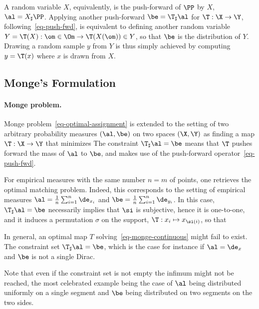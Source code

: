 \begin{rem}
A random variable $X$, equivalently, is the push-forward of $\PP$ by $X$, $\al=X_\sharp\PP$.
%
Applying another push-forward $\be = \T_\sharp\al$ for $\T : \X \rightarrow \Y$, following~\eqref{eq-push-fwd}, is equivalent to defining another random variable $Y=\T(X) : \om \in \Om \rightarrow \T(X(\om)) \in Y$, so that $\be$ is the distribution of $Y$.
%
Drawing a random sample $y$ from $Y$ is thus simply achieved by computing $y=\T(x)$ where $x$ is drawn from $X$. 
\end{rem}


\subsection{Monge's Formulation}


\paragraph{Monge problem.}

Monge problem~\eqref{eq-optimal-assignment} is extended to the setting of two arbitrary probability measures $(\al,\be)$ on two spaces $(\X,\Y)$ as finding a map $\T : \X \rightarrow \Y$ that minimizes
The constraint $\T_\sharp \al = \be$ means that $\T$ pushes forward the mass of $\al$ to $\be$, and makes use of the push-forward operator~\eqref{eq-push-fwd}. 

For empirical measures with the same number $n=m$ of points, one retrieves the optimal matching problem. Indeed, this corresponds to the setting of empirical measures $\al=\frac{1}{n}\sum_{i=1}^n \de_{x_i}$ and $\be=\frac{1}{n}\sum_{i=1}^n \de_{y_i}$. In this case, $\T_\sharp \al=\be$ necessarily implies that $\si$ is subjective, hence it is one-to-one, and it induces a permutation $\sigma$ on the support, $\T : x_i \mapsto x_{\si(i)}$, so that 

In general, an optimal map $T$ solving~\eqref{eq-monge-continuous} might fail to exist. The constraint set $\T_\sharp \al = \be$, which is the case for instance if $\al=\de_x$ and $\be$ is not a single Dirac. 

Note that even if the constraint set is not empty the infimum might not be reached, the most celebrated example being the case of $\al$ being distributed uniformly on a single segment and $\be$ being distributed on two segments on the two sides.

